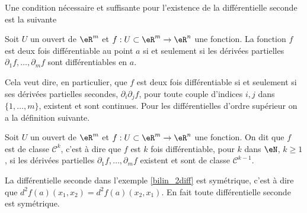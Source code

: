 Une condition nécessaire et suffisante pour l'existence de la différentielle seconde est la suivante
\begin{proposition}
   Soit $U$ un ouvert de $\eR^m$ et  $f:U\subset\eR^m\to \eR^n$ une fonction. La fonction $f$ est deux fois différentiable au point $a$ si et seulement si les dérivées partielles $\partial_1 f, \ldots, \partial_m f $ sont différentiables en $a$. 
\end{proposition}
Cela veut dire, en particulier, que $f$ est deux fois différentiable si et seulement si ses dérivées partielles secondes, $\partial_i\partial_j f$, pour toute couple d'indices $i,j$  dans $\{1,\ldots, m\}$, existent et sont continues. Pour les différentielles d'ordre supérieur on a la définition suivante.
\begin{definition}
  Soit $U$ un ouvert de $\eR^m$ et  $f:U\subset\eR^m\to \eR^n$ une fonction. On dit que $f$ est de classe $\mathcal{C}^k$, c'est à dire que $f$ est $k$ fois différentiable,  pour $k$ dans $\eN$, $k\geq 1$, si les dérivées partielles $\partial_1 f, \ldots, \partial_m f $ existent et sont de classe $\mathcal{C}^{k-1}$. 
\end{definition}
La différentielle seconde dans l'exemple  \ref{bilin_2diff} est symétrique, c'est à dire que $d^2f(a)(x_1,x_2)=d^2f(a)(x_2,x_1)$. En fait toute différentielle seconde est symétrique.  


